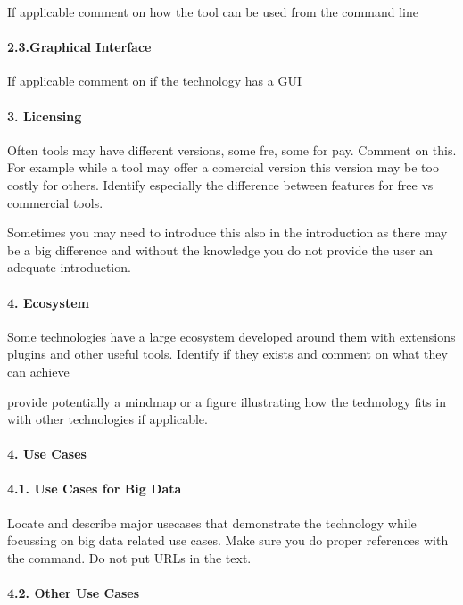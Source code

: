 \documentclass[9pt,twocolumn,twoside]{styles/osajnl}
\begin{document}
If applicable comment on how the tool can be used from the command line

\paragraph{2.3.Graphical Interface}

If applicable comment on if the technology has a GUI

\paragraph{3. Licensing}

Often tools may have different versions, some fre, some for
pay. Comment on this. For example while a tool may offer a comercial
version this version may be too costly for others. Identify especially
the difference between features for free vs commercial tools.

Sometimes you may need to introduce this also in the introduction as
there may be a big difference and without the knowledge you do not
provide the user an adequate introduction.

\paragraph{4. Ecosystem}

Some technologies have a large ecosystem developed around them with
extensions plugins and other useful tools. Identify if they exists and
comment on what they can achieve

provide potentially a mindmap or a figure illustrating how the
technology fits in with other technologies if applicable.

\paragraph{4. Use Cases}

\paragraph{4.1. Use Cases  for Big Data}

Locate and describe major usecases that demonstrate the technology
while focussing on big data related use cases. Make sure you do proper
references with the \cite{?} command. Do not put URLs in the text.

\paragraph {4.2. Other Use Cases}
\end{document}
